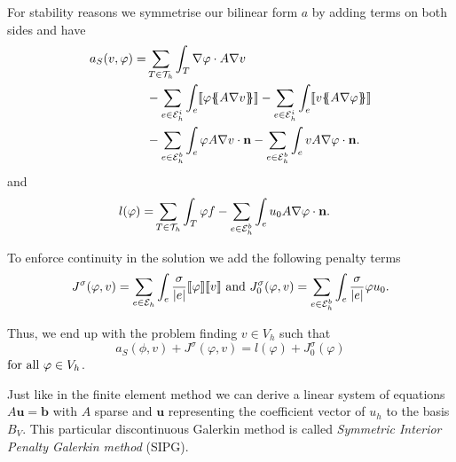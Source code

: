 For stability reasons we symmetrise our bilinear form $a$ by adding terms on both sides and have
\begin{align}
 a_S(v, \varphi) = &\sum\limits_{T \in \triang} \int_T \nabla \varphi \cdot A \nabla v \nonumber \\
  &-\sum\limits_{e \in \edgesi}\int_{e} \jump {\varphi \average{A \nabla v} }
 - \sum\limits_{e \in \edgesi}\int_{e} \jump{ v \average{ A \nabla \varphi}} \nonumber\\ 
 & - \sum\limits_{e \in \edgesb}\int_{e} \varphi A \nabla v \cdot \mathbf n 
    - \sum\limits_{e \in \edgesb}\int_{e} v A \nabla \varphi \cdot \mathbf n.
\end{align}
and 
\begin{align}
	l(\varphi) =& \sum\limits_{T \in \mathcal{T}_h} \int_T \varphi f -\sum\limits_{e \in \mathcal{E}_h^b}\int_{e} u_0 A \nabla \varphi \cdot \mathbf n.
\end{align} 


To enforce continuity in the solution we add the following penalty terms \cite[3.2.2.]{TICAM report} 
\begin{align}
	J^\sigma(\varphi, v) = \sum\limits_{e \in \mathcal{E}_h} \int_e \frac \sigma {|e|} \llbracket \varphi \rrbracket \llbracket v \rrbracket \textnormal{ and } 	J^\sigma_0(\varphi, v) = \sum\limits_{e \in \mathcal{E}_h^b} \int_e \frac \sigma {|e|} \varphi u_0 .
\end{align}

Thus, we end up with the problem finding $v \in V_h$ such that
\[
	a_S(\phi,v) + J^\sigma(\varphi,v) = l(\varphi) + J^\sigma_0(\varphi)
\] 
$  \textnormal{for all } \varphi \in V_h$.

Just like in the finite element method we can derive a linear system of equations $A \mathbf{u} = \mathbf{b}$ with $A$ sparse and $\mathbf{u}$ representing the coefficient vector of $u_h$ to the basis $B_V$.
This particular discontinuous Galerkin method is called \emph{Symmetric Interior Penalty Galerkin method} (SIPG).

